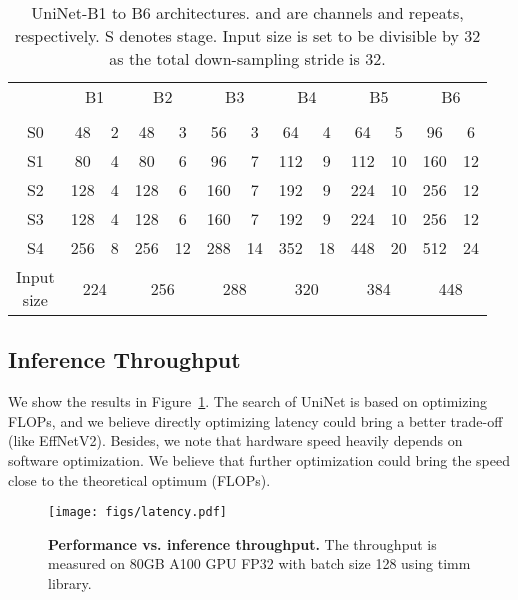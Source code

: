 \documentclass[runningheads]{llncs}
\begin{document}
\begin{table}[h]
    \centering
    \caption{UniNet-B1 to B6 architectures.  and  are channels and repeats, respectively. S denotes stage. Input size is set to be divisible by 32 as the total down-sampling stride is 32.}
\begin{tabular}{c|cc|cc|cc|cc|cc|cc}
    \toprule
    & \multicolumn{2}{c}{B1} & \multicolumn{2}{c}{B2} & \multicolumn{2}{c}{B3} & \multicolumn{2}{c}{B4} & \multicolumn{2}{c}{B5} & \multicolumn{2}{c}{B6} \\
    &  &  &  &  &  &  &  &  &  &  &  & \\
    \midrule
    S0 & 48 & 2 & 48 & 3 & 56 & 3 & 64 & 4 & 64 & 5 & 96 & 6 \\
    S1 & 80 & 4 & 80 & 6 & 96 & 7 & 112 & 9 & 112 & 10 & 160 & 12 \\
    S2 & 128 & 4 & 128 & 6 & 160 & 7 & 192 & 9 & 224 & 10 & 256 & 12 \\
    S3 & 128 & 4 & 128 & 6 & 160 & 7 & 192 & 9 & 224 & 10 & 256 & 12 \\
    S4 & 256 & 8 & 256 & 12 & 288 & 14 & 352 & 18 & 448 & 20 & 512 & 24 \\
    \midrule
    \makecell{Input \\ size} & \multicolumn{2}{c|}{224} & \multicolumn{2}{c|}{256} & \multicolumn{2}{c|}{288} & \multicolumn{2}{c|}{320} & \multicolumn{2}{c|}{384} & \multicolumn{2}{c}{448} \\
    
    \bottomrule
    \end{tabular}
\label{tab:uninet}
\end{table}

\subsection{Inference Throughput}
We show the results in Figure~\ref{fig:latency}. The search of UniNet is based on optimizing FLOPs, and we believe directly optimizing latency could bring a better trade-off (like EffNetV2). Besides, we note that hardware speed heavily depends on software optimization. We believe that further optimization could bring the speed close to the theoretical optimum (FLOPs).
\begin{figure}[h]
    \centering
    \vspace{-1em}
    \texttt{[image: figs/latency.pdf]}
\caption{\textbf{Performance vs. inference throughput.} The throughput is measured on 80GB A100 GPU FP32 with batch size 128 using timm library\protect\footnotemark.}
    \label{fig:latency}
\end{figure}
\end{document}
